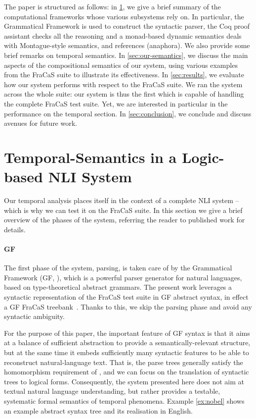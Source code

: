 \documentclass[11pt,a4paper]{article}
\begin{document}
The paper is structured as follows: in \cref{sec:background}, we give
a brief summary of the computational frameworks whose various
subsystems rely on. In particular, the Grammatical Framework is used
to construct the syntactic parser, the Coq proof assistant checks all
the reasoning and a monad-based dynamic semantics deals with
Montague-style semantics, and references (anaphora).  We also provide
some brief remarks on temporal semantics. In \cref{sec:our-semantics},
we discuss the main aspects of the compositional semantics of our
system, using various examples from the FraCaS suite to illustrate its
effectiveness. In \cref{sec:results}, we evaluate how our system
performs with respect to the FraCaS suite. We ran the system across
the whole suite: our system is thus the first which is capable of
handling the complete FraCaS test suite.  Yet, we are interested in
particular in the performance on the temporal section. In
\cref{sec:conclusion}, we conclude and discuss avenues for future
work.


\section{Temporal-Semantics in a Logic-based NLI System}
\label{sec:background}

Our temporal analysis places itself in the context of a complete NLI
system -- which is why we can test it on the FraCaS suite. In this
section we give a brief overview of the phases of the system,
referring the reader to published work for details.

\paragraph{GF}
The first phase of the system, parsing, is taken care of by the 
Grammatical Framework (GF, \citet{ranta_grammatical_2004}), which is a
powerful parser generator for natural languages, based on
type-theoretical abstract grammars.  The present work leverages a
syntactic representation of the FraCaS test suite in GF abstract
syntax, in effect a GF FraCaS treebank~\citep{Ljunglof:2012}. Thanks to this, we skip the parsing
phase and avoid any syntactic ambiguity.

For the purpose of this paper, the important feature of GF
syntax is that it aims at a balance of sufficient abstraction to provide a
semantically-relevant structure, but at the same time it embeds
sufficiently many syntactic features to be able to reconstruct
natural-language text. That is, the parse trees generally satisfy the
homomorphism requirement of \citet{montague_english_1970,montague_proper_1974}, and
we can focus on the translation of syntactic trees to logical forms.
%
Consequently, the system presented
here does not aim at textual natural language understanding, but rather
provides a testable, systematic formal semantics of temporal phenomena.
Example \ref{ex:nobel} shows an example abstract syntax tree and its
realisation in English.
\end{document}
